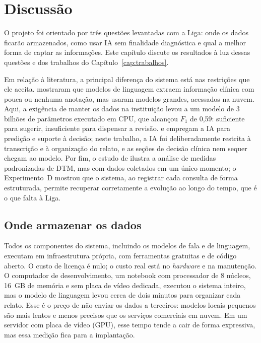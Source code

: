 \chapter{Discussão}
\label{cap:discussao}

O projeto foi orientado por três questões levantadas com a Liga: onde os dados ficarão armazenados, como usar IA sem finalidade diagnóstica e qual a melhor forma de captar as informações. Este capítulo discute os resultados à luz dessas questões e dos trabalhos do Capítulo~\ref{cap:trabalhos}.

Em relação à literatura, a principal diferença do sistema está nas restrições que ele aceita.  mostraram que modelos de linguagem extraem informação clínica com pouca ou nenhuma anotação, mas usaram modelos grandes, acessados na nuvem. Aqui, a exigência de manter os dados na instituição levou a um modelo de 3 bilhões de parâmetros executado em CPU, que alcançou $F_1$ de 0,59: suficiente para sugerir, insuficiente para dispensar a revisão.  e  empregam a IA para predição e suporte à decisão; neste trabalho, a IA foi deliberadamente restrita à transcrição e à organização do relato, e as seções de decisão clínica nem sequer chegam ao modelo. Por fim, o estudo de  ilustra a análise de medidas padronizadas de DTM, mas com dados coletados em um único momento; o Experimento~D mostrou que o sistema, ao registrar cada consulta de forma estruturada, permite recuperar corretamente a evolução ao longo do tempo, que é o que falta à Liga.

\section{Onde armazenar os dados}

Todos os componentes do sistema, incluindo os modelos de fala e de linguagem, executam em infraestrutura própria, com ferramentas gratuitas e de código aberto. O custo de licença é nulo; o custo real está no \textit{hardware} e na manutenção. O computador de desenvolvimento, um notebook com processador de 8 núcleos, 16~GB de memória e sem placa de vídeo dedicada, executou o sistema inteiro, mas o modelo de linguagem levou cerca de dois minutos para organizar cada relato. Esse é o preço de não enviar os dados a terceiros: modelos locais pequenos são mais lentos e menos precisos que os serviços comerciais em nuvem. Em um servidor com placa de vídeo (GPU), esse tempo tende a cair de forma expressiva, mas essa medição fica para a implantação.

